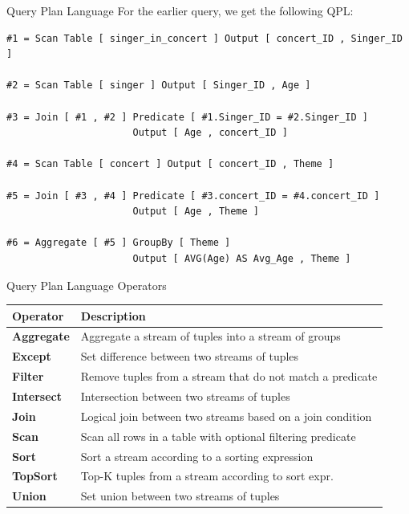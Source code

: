 \documentclass{beamer}
\begin{document}
\begin{frame}[fragile]{Query Plan Language}
    For the earlier query, we get the following QPL:

    \begin{verbatim}
#1 = Scan Table [ singer_in_concert ] Output [ concert_ID , Singer_ID ]
          
#2 = Scan Table [ singer ] Output [ Singer_ID , Age ]
          
#3 = Join [ #1 , #2 ] Predicate [ #1.Singer_ID = #2.Singer_ID ]
                      Output [ Age , concert_ID ]
                      
#4 = Scan Table [ concert ] Output [ concert_ID , Theme ]
          
#5 = Join [ #3 , #4 ] Predicate [ #3.concert_ID = #4.concert_ID ]
                      Output [ Age , Theme ]
                      
#6 = Aggregate [ #5 ] GroupBy [ Theme ]
                      Output [ AVG(Age) AS Avg_Age , Theme ]
    \end{verbatim}
\end{frame}


\begin{frame}{Query Plan Language Operators}
    \begin{table}[h]
  \centering
  \begin{tabular}{ll}
    \toprule
    \textbf{Operator} & \textbf{Description} \\
    \midrule
    \textbf{Aggregate} & Aggregate a stream of tuples into a stream of groups \\
    \textbf{Except} & Set difference between two streams of tuples \\
    \textbf{Filter} & Remove tuples from a stream that do not match a predicate \\
    \textbf{Intersect} & Intersection between two streams of tuples \\
    \textbf{Join} & Logical join  between two streams based on a join condition \\
    \textbf{Scan} & Scan all rows in a table with optional filtering predicate \\
    \textbf{Sort} & Sort a stream according to a sorting expression \\
    \textbf{TopSort} & Top-K tuples from a stream according to sort expr. \\
    \textbf{Union} & Set union between two streams of tuples \\
    \bottomrule
  \end{tabular}
\end{table}
\end{frame}
\end{document}
